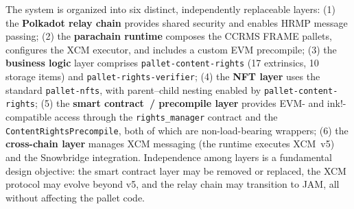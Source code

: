 The system is organized into six distinct, independently replaceable layers: (1) the \textbf{Polkadot relay chain} provides shared security and enables HRMP message passing; (2) the \textbf{parachain runtime} composes the CCRMS FRAME pallets, configures the XCM executor, and includes a custom EVM precompile; (3) the \textbf{business logic} layer comprises \texttt{pallet-content-rights} (17 extrinsics, 10 storage items) and \texttt{pallet-rights-verifier}; (4) the \textbf{NFT layer} uses the standard \texttt{pallet-nfts}, with parent--child nesting enabled by \texttt{pallet-content-rights}; (5) the \textbf{smart contract~/ precompile layer} provides EVM- and ink!-compatible access through the \texttt{rights\_manager} contract and the \texttt{ContentRightsPrecompile}, both of which are non-load-bearing wrappers; (6) the \textbf{cross-chain layer} manages XCM messaging (the runtime executes XCM~v5) and the Snowbridge integration. Independence among layers is a fundamental design objective: the smart contract layer may be removed or replaced, the XCM protocol may evolve beyond v5, and the relay chain may transition to JAM, all without affecting the pallet code.

